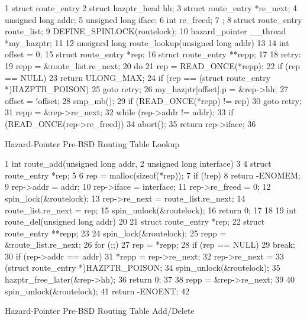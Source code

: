 \begin{listing}[tbp]
{ \scriptsize
\begin{verbbox}
 1 struct route_entry {
 2   struct hazptr_head hh;
 3   struct route_entry *re_next;
 4   unsigned long addr;
 5   unsigned long iface;
 6   int re_freed;
 7 };
 8 struct route_entry route_list;
 9 DEFINE_SPINLOCK(routelock);
10 hazard_pointer __thread *my_hazptr;
11
12 unsigned long route_lookup(unsigned long addr)
13 {
14   int offset = 0;
15   struct route_entry *rep;
16   struct route_entry **repp;
17
18 retry:
19   repp = &route_list.re_next;
20   do {
21     rep = READ_ONCE(*repp);
22     if (rep == NULL)
23       return ULONG_MAX;
24     if (rep == (struct route_entry *)HAZPTR_POISON)
25       goto retry;
26     my_hazptr[offset].p = &rep->hh;
27     offset = !offset;
28     smp_mb();
29     if (READ_ONCE(*repp) != rep)
30       goto retry;
31     repp = &rep->re_next;
32   } while (rep->addr != addr);
33   if (READ_ONCE(rep->re_freed))
34     abort();
35   return rep->iface;
36 }
\end{verbbox}
}
\centering
\theverbbox
\caption{Hazard-Pointer Pre-BSD Routing Table Lookup}
\label{lst:defer:Hazard-Pointer Pre-BSD Routing Table Lookup}
\end{listing}

\begin{listing}[tbp]
{ \scriptsize
\begin{verbbox}
 1 int route_add(unsigned long addr,
 2               unsigned long interface)
 3 {
 4   struct route_entry *rep;
 5
 6   rep = malloc(sizeof(*rep));
 7   if (!rep)
 8     return -ENOMEM;
 9   rep->addr = addr;
10   rep->iface = interface;
11   rep->re_freed = 0;
12   spin_lock(&routelock);
13   rep->re_next = route_list.re_next;
14   route_list.re_next = rep;
15   spin_unlock(&routelock);
16   return 0;
17 }
18
19 int route_del(unsigned long addr)
20 {
21   struct route_entry *rep;
22   struct route_entry **repp;
23
24   spin_lock(&routelock);
25   repp = &route_list.re_next;
26   for (;;) {
27     rep = *repp;
28     if (rep == NULL)
29       break;
30     if (rep->addr == addr) {
31       *repp = rep->re_next;
32       rep->re_next =
33           (struct route_entry *)HAZPTR_POISON;
34       spin_unlock(&routelock);
35       hazptr_free_later(&rep->hh);
36       return 0;
37     }
38     repp = &rep->re_next;
39   }
40   spin_unlock(&routelock);
41   return -ENOENT;
42 }
\end{verbbox}
}
\centering
\theverbbox
\caption{Hazard-Pointer Pre-BSD Routing Table Add/Delete}
\label{lst:defer:Hazard-Pointer Pre-BSD Routing Table Add/Delete}
\end{listing}

